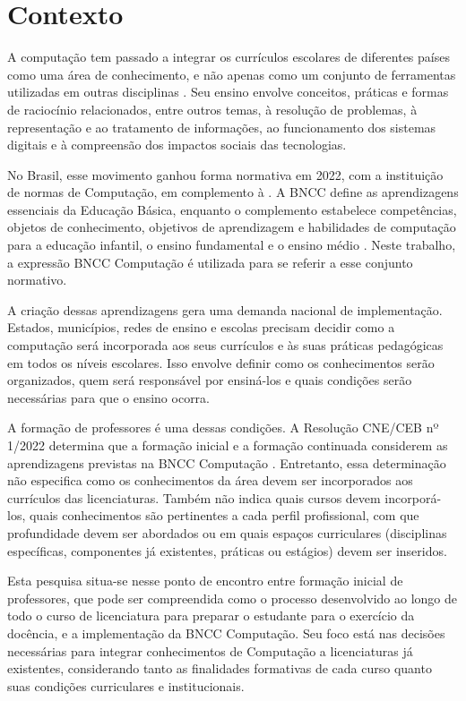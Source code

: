 \section{Contexto}
\label{sec:contexto}

A computação tem passado a integrar os currículos escolares de diferentes países como uma área de conhecimento, e não apenas como um conjunto de ferramentas utilizadas em outras disciplinas \cite{vegas2021building}. Seu ensino envolve conceitos, práticas e formas de raciocínio relacionados, entre outros temas, à resolução de problemas, à representação e ao tratamento de informações, ao funcionamento dos sistemas digitais e à compreensão dos impactos sociais das tecnologias.

No Brasil, esse movimento ganhou forma normativa em 2022, com a instituição de normas de Computação, em complemento à . A BNCC define as aprendizagens essenciais da Educação Básica, enquanto o complemento estabelece competências, objetos de conhecimento, objetivos de aprendizagem e habilidades de computação para a educação infantil, o ensino fundamental e o ensino médio \cite{brasil2022resolucao1,brasil2022bncccomputacao}. Neste trabalho, a expressão BNCC Computação é utilizada para se referir a esse conjunto normativo.

A criação dessas aprendizagens gera uma demanda nacional de implementação. Estados, municípios, redes de ensino e escolas precisam decidir como a computação será incorporada aos seus currículos e às suas práticas pedagógicas em todos os níveis escolares. Isso envolve definir como os conhecimentos serão organizados, quem será responsável por ensiná-los e quais condições serão necessárias para que o ensino ocorra.

A formação de professores é uma dessas condições. A Resolução CNE/CEB nº 1/2022 determina que a formação inicial e a formação continuada considerem as aprendizagens previstas na BNCC Computação \cite{brasil2022resolucao1}. Entretanto, essa determinação não especifica como os conhecimentos da área devem ser incorporados aos currículos das licenciaturas. Também não indica quais cursos devem incorporá-los, quais conhecimentos são pertinentes a cada perfil profissional, com que profundidade devem ser abordados ou em quais espaços curriculares (disciplinas específicas, componentes já existentes, práticas ou estágios) devem ser inseridos.

Esta pesquisa situa-se nesse ponto de encontro entre formação inicial de professores, que pode ser compreendida como o processo desenvolvido ao longo de todo o curso de licenciatura para preparar o estudante para o exercício da docência, e a implementação da BNCC Computação. Seu foco está nas decisões necessárias para integrar conhecimentos de Computação a licenciaturas já existentes, considerando tanto as finalidades formativas de cada curso quanto suas condições curriculares e institucionais.


